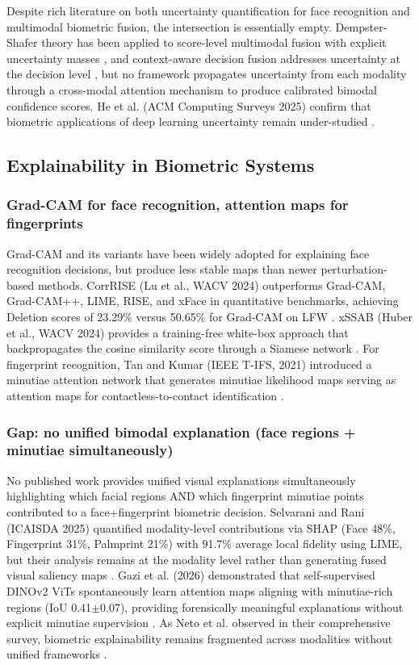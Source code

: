 \documentclass[10pt,journal,compsoc]{IEEEtran}
\begin{document}
Despite rich literature on both uncertainty quantification for face recognition and multimodal biometric fusion, the intersection is essentially empty. Dempster-Shafer theory has been applied to score-level multimodal fusion with explicit uncertainty masses \cite{REF10}, and context-aware decision fusion addresses uncertainty at the decision level \cite{REF11}, but no framework propagates uncertainty from each modality through a cross-modal attention mechanism to produce calibrated bimodal confidence scores. He et al. (ACM Computing Surveys 2025) confirm that biometric applications of deep learning uncertainty remain under-studied \cite{REF12}.

\subsection{Explainability in Biometric Systems}

\subsubsection{Grad-CAM for face recognition, attention maps for fingerprints}

Grad-CAM and its variants have been widely adopted for explaining face recognition decisions, but produce less stable maps than newer perturbation-based methods. CorrRISE (Lu et al., WACV 2024) outperforms Grad-CAM, Grad-CAM++, LIME, RISE, and xFace in quantitative benchmarks, achieving Deletion scores of 23.29\% versus 50.65\% for Grad-CAM on LFW \cite{REF316}. xSSAB (Huber et al., WACV 2024) provides a training-free white-box approach that backpropagates the cosine similarity score through a Siamese network \cite{REF389}. For fingerprint recognition, Tan and Kumar (IEEE T-IFS, 2021) introduced a minutiae attention network that generates minutiae likelihood maps serving as attention maps for contactless-to-contact identification \cite{REF315}.

\subsubsection{Gap: no unified bimodal explanation (face regions + minutiae simultaneously)}

No published work provides unified visual explanations simultaneously highlighting which facial regions AND which fingerprint minutiae points contributed to a face+fingerprint biometric decision. Selvarani and Rani (ICAISDA 2025) quantified modality-level contributions via SHAP (Face 48\%, Fingerprint 31\%, Palmprint 21\%) with 91.7\% average local fidelity using LIME, but their analysis remains at the modality level rather than generating fused visual saliency maps \cite{REF56}. Gazi et al. (2026) demonstrated that self-supervised DINOv2 ViTs spontaneously learn attention maps aligning with minutiae-rich regions (IoU 0.41$\pm$0.07), providing forensically meaningful explanations without explicit minutiae supervision \cite{REF48}. As Neto et al. observed in their comprehensive survey, biometric explainability remains fragmented across modalities without unified frameworks \cite{REF344}.
\end{document}
